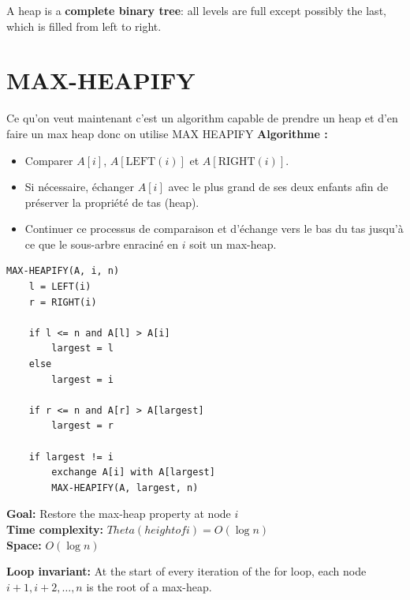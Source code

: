 \documentclass[11pt,a4paper,openany]{book}
\begin{document}
\begin{defnbox}[title=Shape property]
A heap is a \textbf{complete binary tree}: all levels are full except possibly the last, which is filled from left to right.
\end{defnbox}





\vspace{2cm}




\section{MAX-HEAPIFY}

Ce qu'on veut maintenant c'est un algorithm capable de prendre un heap et d'en 
faire un max heap donc on utilise MAX HEAPIFY
\textbf{Algorithme :}
\begin{itemize}
    \item Comparer $A[i]$, $A[\mathrm{LEFT}(i)]$ et $A[\mathrm{RIGHT}(i)]$.
    
    \item Si nécessaire, échanger $A[i]$ avec le plus grand de ses deux enfants afin de préserver la propriété de tas (heap).
    
    \item Continuer ce processus de comparaison et d'échange vers le bas du tas jusqu'à ce que le sous-arbre enraciné en $i$ soit un max-heap.
\end{itemize}


\begin{lstlisting}
MAX-HEAPIFY(A, i, n)
    l = LEFT(i)
    r = RIGHT(i)

    if l <= n and A[l] > A[i]
        largest = l
    else
        largest = i

    if r <= n and A[r] > A[largest]
        largest = r

    if largest != i
        exchange A[i] with A[largest]
        MAX-HEAPIFY(A, largest, n)
\end{lstlisting}

\textbf{Goal:} Restore the max-heap property at node $i$ \\
\textbf{Time complexity:} $Theta(height of i) =  O(\log n)$ \\
\textbf{Space:} $O(\log n)$




\textbf{Loop invariant:} At the start of every iteration of the for loop, each node
$i + 1, i + 2, \ldots, n$ is the root of a max-heap.
\end{document}

